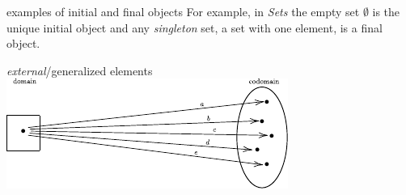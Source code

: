 \begin{frame}
\begin{block}{examples of initial and final objects}
For example, in \textit{Sets} the empty set $\emptyset$ is the unique
initial object and any {\it singleton} set, a set with one element,
is a final object.
\end{block}

\begin{block}{{\it external}/generalized elements}
\centering\includegraphics[width=0.8\framewidth]{fig/points.pdf}
\end{block}
\end{frame}